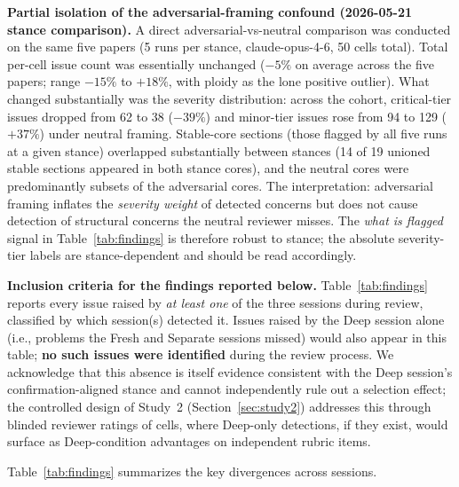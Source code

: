 \documentclass[12pt]{article}
\begin{document}
\textbf{Partial isolation of the adversarial-framing confound (2026-05-21 stance comparison).} A direct adversarial-vs-neutral comparison was conducted on the same five papers (5 runs per stance, claude-opus-4-6, 50 cells total). Total per-cell issue count was essentially unchanged ($-5\%$ on average across the five papers; range $-15\%$ to $+18\%$, with ploidy as the lone positive outlier). What changed substantially was the severity distribution: across the cohort, critical-tier issues dropped from 62 to 38 ($-39\%$) and minor-tier issues rose from 94 to 129 ($+37\%$) under neutral framing. Stable-core sections (those flagged by all five runs at a given stance) overlapped substantially between stances (14 of 19 unioned stable sections appeared in both stance cores), and the neutral cores were predominantly subsets of the adversarial cores. The interpretation: adversarial framing inflates the \emph{severity weight} of detected concerns but does not cause detection of structural concerns the neutral reviewer misses. The \emph{what is flagged} signal in Table~\ref{tab:findings} is therefore robust to stance; the absolute severity-tier labels are stance-dependent and should be read accordingly.

\textbf{Inclusion criteria for the findings reported below.} Table~\ref{tab:findings} reports every issue raised by \emph{at least one} of the three sessions during review, classified by which session(s) detected it. Issues raised by the Deep session alone (i.e., problems the Fresh and Separate sessions missed) would also appear in this table; \textbf{no such issues were identified} during the review process. We acknowledge that this absence is itself evidence consistent with the Deep session's confirmation-aligned stance and cannot independently rule out a selection effect; the controlled design of Study~2 (Section~\ref{sec:study2}) addresses this through blinded reviewer ratings of cells, where Deep-only detections, if they exist, would surface as Deep-condition advantages on independent rubric items.

Table~\ref{tab:findings} summarizes the key divergences across sessions.
\end{document}
